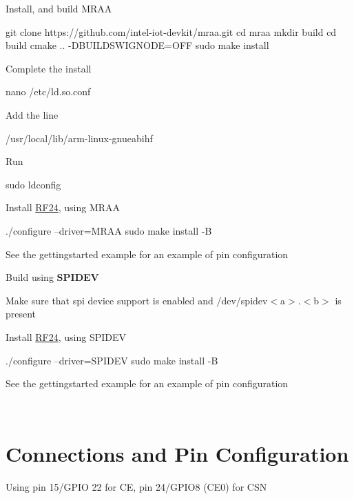 \begin{DoxyEnumerate}
\item Install, and build M\+R\+AA 
\begin{DoxyCode}
git clone https:\textcolor{comment}{//github.com/intel-iot-devkit/mraa.git}
cd mraa
mkdir build
cd build
cmake .. -DBUILDSWIGNODE=OFF
sudo make install
\end{DoxyCode}

\item Complete the install ~\newline
 
\begin{DoxyCode}
nano /etc/ld.so.conf 
\end{DoxyCode}
 Add the line
\begin{DoxyCode}
/usr/local/lib/arm-linux-gnueabihf 
\end{DoxyCode}
 Run
\begin{DoxyCode}
sudo ldconfig 
\end{DoxyCode}

\item Install \hyperlink{classRF24}{R\+F24}, using M\+R\+AA 
\begin{DoxyCode}
./configure --driver=MRAA
sudo make install -B
\end{DoxyCode}
 See the gettingstarted example for an example of pin configuration
\end{DoxyEnumerate}

Build using {\bfseries S\+P\+I\+D\+EV}


\begin{DoxyEnumerate}
\item Make sure that spi device support is enabled and /dev/spidev$<$a$>$.$<$b$>$ is present
\item Install \hyperlink{classRF24}{R\+F24}, using S\+P\+I\+D\+EV 
\begin{DoxyCode}
./configure --driver=SPIDEV
sudo make install -B
\end{DoxyCode}

\item See the gettingstarted example for an example of pin configuration
\end{DoxyEnumerate}

~\newline
 \hypertarget{RPi_Pins}{}\section{Connections and Pin Configuration}\label{RPi_Pins}
Using pin 15/\+G\+P\+IO 22 for CE, pin 24/\+G\+P\+I\+O8 (C\+E0) for C\+SN

